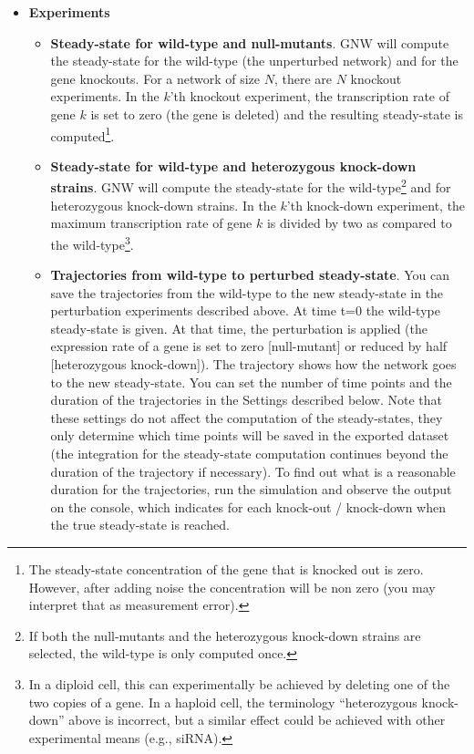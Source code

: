 \documentclass{llncs}
\newenvironment{mylist}{
\begin{itemize}
}{\end{itemize}}
\begin{document}
\begin{mylist}

\item \textbf{Experiments}

\begin{itemize}

\item \textbf{Steady-state for wild-type and null-mutants}. GNW will compute the steady-state for the wild-type (the unperturbed network) and for the gene knockouts. For a network of size $N$, there are $N$ knockout experiments. In the $k$'th knockout experiment, the transcription rate of gene $k$ is set to zero (the gene is deleted) and the resulting steady-state is computed\footnote{The steady-state concentration of the gene that is knocked out is zero. However, after adding noise the concentration will be non zero (you may interpret that as measurement error).}.\\

\item \textbf{Steady-state for wild-type and heterozygous knock-down strains}. GNW will compute the steady-state for the wild-type\footnote{If both the null-mutants and the heterozygous knock-down strains are selected, the wild-type is only computed once.} and for heterozygous knock-down strains. In the $k$'th knock-down experiment, the maximum transcription rate of gene $k$ is divided by two as compared to the wild-type\footnote{In a diploid cell, this can experimentally be achieved by deleting one of the two copies of a gene. In a haploid cell, the terminology ``heterozygous knock-down'' above is incorrect, but a similar effect could be achieved with other experimental means (e.g., siRNA).}.\\

\item \textbf{Trajectories from wild-type to perturbed steady-state}. You can save the trajectories from the wild-type to the new steady-state in the perturbation experiments described above. At time t=0 the wild-type steady-state is given. At that time, the perturbation is applied (the expression rate of a gene is set to zero [null-mutant] or reduced by half [heterozygous knock-down]). The trajectory shows how the network goes to the new steady-state. You can set the number of time points and the duration of the trajectories in the Settings described below. Note that these settings do not affect the computation of the steady-states, they only determine which time points will be saved in the exported dataset (the integration for the steady-state computation continues beyond the duration of the trajectory if necessary). To find out what is a reasonable duration for the trajectories, run the simulation and observe the output on the console, which indicates for each knock-out / knock-down when the true steady-state is reached.\\


\end{itemize}
\end{mylist}
\end{document}
